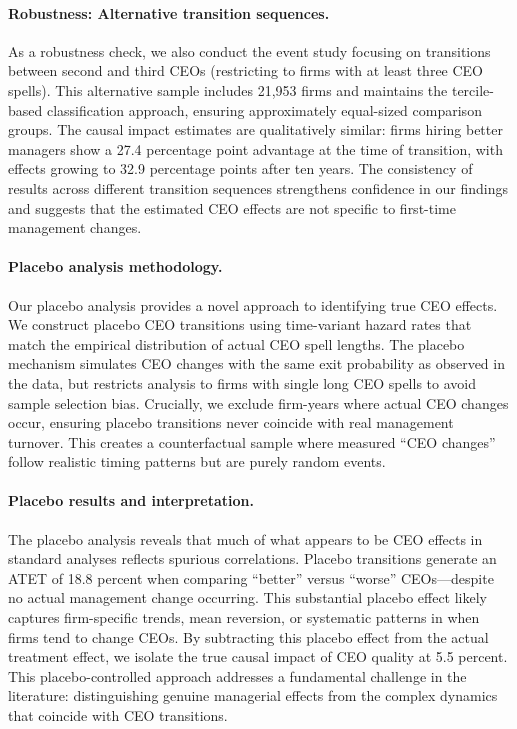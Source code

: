 \documentclass[11pt,a4paper]{article}
\begin{document}
\paragraph{Robustness: Alternative transition sequences.} As a robustness check, we also conduct the event study focusing on transitions between second and third CEOs (restricting to firms with at least three CEO spells). This alternative sample includes 21,953 firms and maintains the tercile-based classification approach, ensuring approximately equal-sized comparison groups. The causal impact estimates are qualitatively similar: firms hiring better managers show a 27.4 percentage point advantage at the time of transition, with effects growing to 32.9 percentage points after ten years. The consistency of results across different transition sequences strengthens confidence in our findings and suggests that the estimated CEO effects are not specific to first-time management changes.

\paragraph{Placebo analysis methodology.} Our placebo analysis provides a novel approach to identifying true CEO effects. We construct placebo CEO transitions using time-variant hazard rates that match the empirical distribution of actual CEO spell lengths. The placebo mechanism simulates CEO changes with the same exit probability as observed in the data, but restricts analysis to firms with single long CEO spells to avoid sample selection bias. Crucially, we exclude firm-years where actual CEO changes occur, ensuring placebo transitions never coincide with real management turnover. This creates a counterfactual sample where measured ``CEO changes'' follow realistic timing patterns but are purely random events.

\paragraph{Placebo results and interpretation.} The placebo analysis reveals that much of what appears to be CEO effects in standard analyses reflects spurious correlations. Placebo transitions generate an ATET of 18.8 percent when comparing ``better'' versus ``worse'' CEOs---despite no actual management change occurring. This substantial placebo effect likely captures firm-specific trends, mean reversion, or systematic patterns in when firms tend to change CEOs. By subtracting this placebo effect from the actual treatment effect, we isolate the true causal impact of CEO quality at 5.5 percent. This placebo-controlled approach addresses a fundamental challenge in the literature: distinguishing genuine managerial effects from the complex dynamics that coincide with CEO transitions. 
\end{document}

